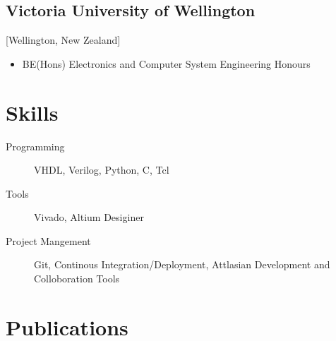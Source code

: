 \documentclass{mycv}
\begin{document}
\subsection{Victoria University of Wellington}[Wellington, New Zealand]
\vspace{-\parskip}%
\begin{itemize}[label={}]
  \item BE(Hons) Electronics and Computer System Engineering Honours 
\end{itemize}

\section{Skills}

\begin{description}
  \item[Programming] VHDL, Verilog, Python, C, Tcl
  \item[Tools] Vivado, Altium Desiginer
  \item[Project Mangement] Git, Continous Integration/Deployment, Attlasian Development and Colloboration Tools
\end{description}

\section{Publications}%

\end{document}
